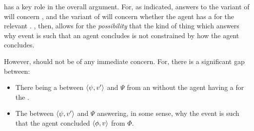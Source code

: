 \begin{note}
  \supportII{} has a key role in the overall argument.
  For, as indicated, answers to the variant of \qWhy{} will concern \ros{}, and the variant of \qHow{} will concern whether the agent has a \wit{} for the relevant \ros{}.
  \supportII{}, then, allows for the \emph{possibility} that the kind of thing which answers why event is such that an agent concludes is not constrained by how the agent concludes.

  However, \supportII{} should not be of any immediate concern.
  For, there is a significant gap between:

  \begin{itemize}[noitemsep]
  \item
    There being a \ros{} between \(\langle \psi, v' \rangle\) and \(\Psi\) from an \agpe{} without the agent having a \wit{} for the \ros{}.
  \item
    The \ros{} between \(\langle \psi, v' \rangle\) and \(\Psi\)  answering, in some sense, why the event is such that the agent concluded \(\langle \phi, v \rangle\) from \(\Phi\).
  \end{itemize}
\end{note}







